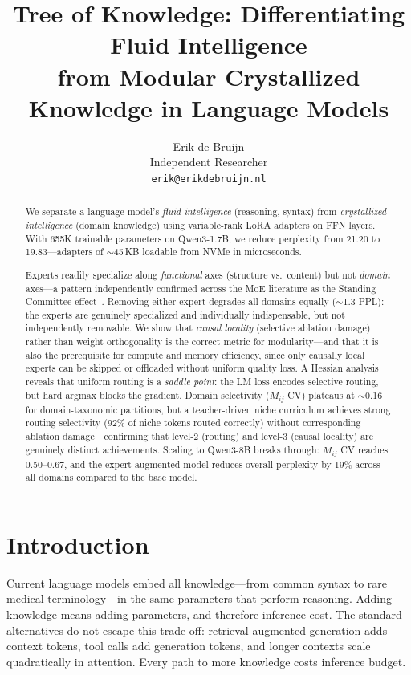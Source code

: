 \documentclass{article}
\title{Tree of Knowledge: Differentiating Fluid Intelligence \\ from Modular Crystallized Knowledge in Language Models}
\author{
  Erik de Bruijn \\
  Independent Researcher \\
  \texttt{erik@erikdebruijn.nl}
}
\begin{document}
\maketitle

\begin{abstract}
We separate a language model's \emph{fluid intelligence} (reasoning, syntax)
from \emph{crystallized intelligence} (domain knowledge) using variable-rank
LoRA adapters on FFN layers. With 655K trainable parameters on Qwen3-1.7B, we
reduce perplexity from 21.20 to 19.83---adapters of $\sim$45\,KB loadable from
NVMe in microseconds.

Experts readily specialize along \emph{functional} axes (structure vs.\
content) but not \emph{domain} axes---a pattern independently confirmed across
the MoE literature as the Standing Committee
effect~\cite{standing2026, domaindriver2026}. Removing either expert degrades
all domains equally ($\sim$1.3 PPL): the experts are genuinely specialized and
individually indispensable, but not independently removable. We show that \emph{causal locality} (selective ablation damage) rather than
weight orthogonality is the correct metric for modularity---and that it is
also the prerequisite for compute and memory efficiency, since only causally
local experts can be skipped or offloaded without uniform quality loss.
A Hessian analysis reveals that uniform routing is a \emph{saddle point}:
the LM loss encodes selective routing, but hard argmax blocks the gradient.
Domain selectivity ($M_{ij}$ CV) plateaus at $\sim$0.16 for domain-taxonomic
partitions, but a teacher-driven niche curriculum achieves strong routing selectivity
(92\% of niche tokens routed correctly) without corresponding ablation
damage---confirming that level-2 (routing) and level-3 (causal locality)
are genuinely distinct achievements. Scaling to Qwen3-8B breaks through:
$M_{ij}$ CV reaches 0.50--0.67, and the expert-augmented model reduces overall
perplexity by 19\% across all domains compared to the base model.
\end{abstract}

\section{Introduction}
\label{sec:intro}

Current language models embed all knowledge---from common syntax to rare medical terminology---in the same parameters that perform reasoning. Adding knowledge means adding parameters, and therefore inference cost. The standard alternatives do not escape this trade-off: retrieval-augmented generation adds context tokens, tool calls add generation tokens, and longer contexts scale quadratically in attention. Every path to more knowledge costs inference budget.
\end{document}
